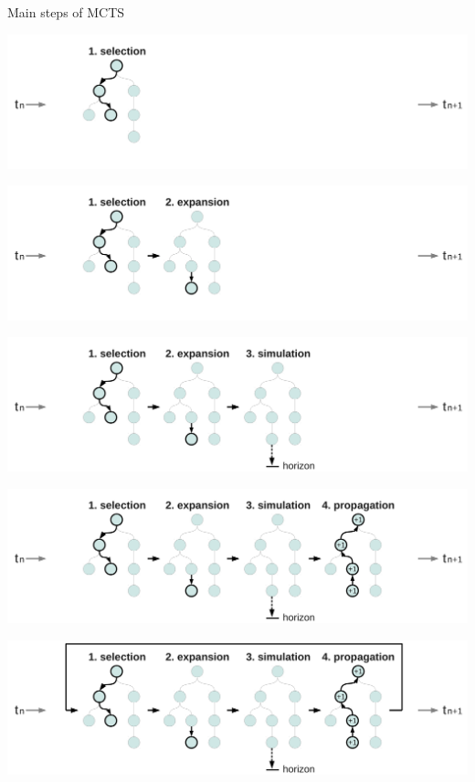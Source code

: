 \begin{frame}{Main steps of MCTS}
     {
        \begin{center}
            \includegraphics[width=.75\linewidth]{fig/tree10a}
        \end{center}
    }
     {
        \begin{center}
            \includegraphics[width=.75\linewidth]{fig/tree10b}
        \end{center}
    }
     {
        \begin{center}
            \includegraphics[width=.75\linewidth]{fig/tree10c}
        \end{center}
    }
     {
        \begin{center}
            \includegraphics[width=.75\linewidth]{fig/tree10d}
        \end{center}
    }
     {
        \begin{center}
            \includegraphics[width=.75\linewidth]{fig/tree10e}

\end{center}}
\end{frame}
